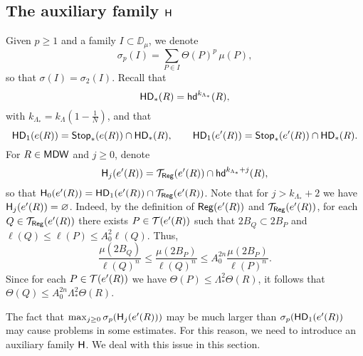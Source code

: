 \vv









\subsection{The auxiliary family \texorpdfstring{${\mathsf{H}}$}{H}}\label{subsec:H}

Given $p\geq1$ and a family $I\subset\DD_\mu$, we denote
$$\sigma_p(I) = \sum_{P\in I}\Theta(P)^p\,\mu(P),$$
so that $\sigma(I)=\sigma_2(I)$. 
Recall that  
$${\mathsf{HD}}_*(R) = {\mathsf{hd}}^{k_{\Lambda_*}}(R),$$
with $k_{\Lambda_*}=k_\Lambda(1-\frac1N)$,
and that
$${\mathsf{HD}}_1(e(R)) = {\mathsf {Stop}}_*(e(R))\cap {\mathsf{HD}}_*(R),\qquad  {\mathsf{HD}}_1(e'(R)) = {\mathsf {Stop}}_*(e'(R))\cap {\mathsf{HD}}_*(R).
$$
For $R\in{\mathsf{MDW}}$ and $j\geq0$, denote 
$${\mathsf{H}}_j(e'(R))= {\mathcal T}_{\mathsf{Reg}}(e'(R)) \cap {\mathsf{hd}}^{k_{\Lambda_*} + j}(R),$$
so that ${\mathsf{H}}_0(e'(R))={\mathsf{HD}}_1(e'(R))\cap{\mathcal T}_{\mathsf{Reg}}(e'(R))$. 
\brem\label{rem:Hjempty}
Note that for $j> k_{\Lambda_*}+2$ we have ${\mathsf{H}}_j(e'(R))=\varnothing$. Indeed, by the definition of ${\mathsf{Reg}}(e'(R))$ and ${\mathcal T}_{\mathsf{Reg}}(e'(R))$, for each $Q\in {\mathcal T}_{\mathsf{Reg}}(e'(R))$ there exists $P\in {\mathcal T}(e'(R))$ such that $2B_Q\subset 2B_P$ and $\ell(Q)\le \ell(P)\le A_0^2\ell(Q)$. Thus,
\begin{equation*}
\frac{\mu(2B_Q)}{\ell(Q)^n}\le \frac{\mu(2B_P)}{\ell(Q)^n}\le A_0^{2n}\frac{\mu(2B_P)}{\ell(P)^n}.
\end{equation*}
Since for each $P\in {\mathcal T}(e'(R))$ we have $\Theta(P)\le \Lambda_*^2\Theta(R)$, it follows that $\Theta(Q)\le A_0^{2n}\Lambda_*^2\Theta(R)$.
\erem


The fact that $\max_{j\geq0} \sigma_p({\mathsf{H}}_j(e'(R)))$ may be much larger than $\sigma_p({\mathsf{HD}}_1(e'(R))$ may cause problems in some estimates. For this reason,
we need to introduce an auxiliary family ${\mathsf{H}}$. We deal with this issue in this section.

